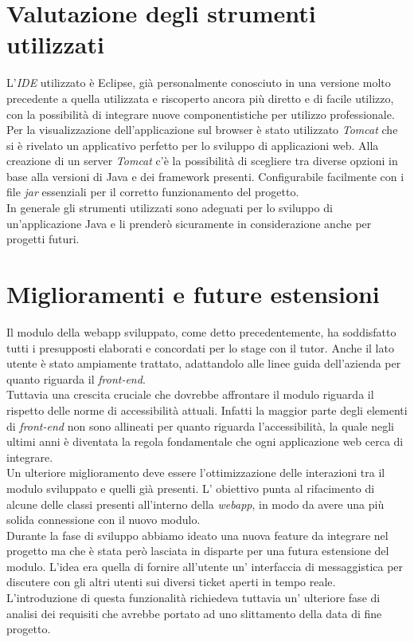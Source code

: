 \section{Valutazione degli strumenti utilizzati}
L'\textit{IDE} utilizzato è Eclipse, già personalmente conosciuto in una versione molto precedente a quella utilizzata e riscoperto ancora più diretto e di facile utilizzo, con la possibilità di integrare nuove componentistiche per utilizzo professionale.\\
Per la visualizzazione dell'applicazione sul browser è stato utilizzato \textit{Tomcat} che si è rivelato un applicativo perfetto per lo sviluppo di applicazioni web. Alla creazione di un server \textit{Tomcat} c'è la possibilità di scegliere tra diverse opzioni in base alla versioni di Java e dei framework presenti. Configurabile facilmente con i file \textit{jar} essenziali per il corretto funzionamento del progetto.\\
In generale gli strumenti utilizzati sono adeguati per lo sviluppo di un'applicazione Java e li prenderò sicuramente in considerazione anche per progetti futuri.
 
\section{Miglioramenti e future estensioni}
Il modulo della webapp sviluppato, come detto precedentemente, ha soddisfatto tutti i presupposti elaborati e concordati per lo stage con il tutor. Anche il lato utente è stato ampiamente trattato, adattandolo alle linee guida dell'azienda per quanto riguarda il \textit{front-end}.\\
Tuttavia una crescita cruciale che dovrebbe affrontare il modulo riguarda il rispetto delle norme di accessibilità attuali. Infatti la maggior parte degli elementi di \textit{front-end} non sono allineati per quanto riguarda l'accessibilità, la quale negli ultimi anni è diventata la regola fondamentale che ogni applicazione web cerca di integrare.\\
Un ulteriore miglioramento deve essere l'ottimizzazione delle interazioni tra il modulo sviluppato e quelli già presenti. L' obiettivo punta al rifacimento di alcune delle classi presenti all'interno della \textit{webapp}, in modo da avere una più solida connessione con il nuovo modulo. \\
Durante la fase di sviluppo abbiamo ideato una nuova feature da integrare nel progetto ma che è stata però lasciata in disparte per una futura estensione del modulo. L'idea era quella di fornire all'utente un' interfaccia di messaggistica per discutere con gli altri utenti sui diversi ticket aperti in tempo reale. L'introduzione di questa funzionalità richiedeva tuttavia un' ulteriore fase di analisi dei requisiti che avrebbe portato ad uno slittamento della data di fine progetto. 